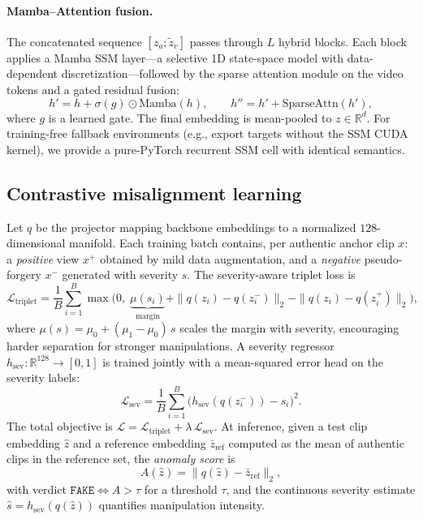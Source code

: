 \documentclass[sn-basic,Numbered,referee]{sn-jnl}
\begin{document}
\paragraph{Mamba--Attention fusion.}
The concatenated sequence $[z_a; \tilde{z}_v]$ passes through $L$ hybrid blocks. Each block applies a Mamba SSM layer---a selective 1D state-space model with data-dependent discretization---followed by the sparse attention module on the video tokens and a gated residual fusion:
\begin{equation}
h' = h + \sigma(g) \odot \text{Mamba}(h), \qquad
h'' = h' + \text{SparseAttn}(h'),
\end{equation}
where $g$ is a learned gate. The final embedding is mean-pooled to $z \in \mathbb{R}^{d}$. For training-free fallback environments (e.g., export targets without the SSM CUDA kernel), we provide a pure-PyTorch recurrent SSM cell with identical semantics.

\subsection{Contrastive misalignment learning}
\label{sec:cml}

Let $q$ be the projector mapping backbone embeddings to a normalized $128$-dimensional manifold. Each training batch contains, per authentic anchor clip $x$: a \emph{positive} view $x^+$ obtained by mild data augmentation, and a \emph{negative} pseudo-forgery $x^-$ generated with severity $s$. The severity-aware triplet loss is
\begin{equation}
\mathcal{L}_\text{triplet} = \frac{1}{B}\sum_{i=1}^{B}
\max\!\big(0,\; \underbrace{\mu(s_i)}_{\text{margin}} + \|q(z_i) - q(z_i^-)\|_2 - \|q(z_i) - q(z_i^+)\|_2\big),
\end{equation}
where $\mu(s) = \mu_0 + (\mu_1 - \mu_0)\,s$ scales the margin with severity, encouraging harder separation for stronger manipulations. A severity regressor $h_\text{sev}: \mathbb{R}^{128} \to [0,1]$ is trained jointly with a mean-squared error head on the severity labels:
\begin{equation}
\mathcal{L}_\text{sev} = \frac{1}{B}\sum_{i=1}^{B}\big(h_\text{sev}(q(z_i^-)) - s_i\big)^2.
\end{equation}
The total objective is $\mathcal{L} = \mathcal{L}_\text{triplet} + \lambda\,\mathcal{L}_\text{sev}$. At inference, given a test clip embedding $\hat{z}$ and a reference embedding $\bar{z}_\text{ref}$ computed as the mean of authentic clips in the reference set, the \emph{anomaly score} is
\begin{equation}
A(\hat{z}) = \|q(\hat{z}) - \bar{z}_\text{ref}\|_2,
\end{equation}
with verdict $\texttt{FAKE} \iff A > \tau$ for a threshold $\tau$, and the continuous severity estimate $\hat{s} = h_\text{sev}(q(\hat{z}))$ quantifies manipulation intensity.
\end{document}
